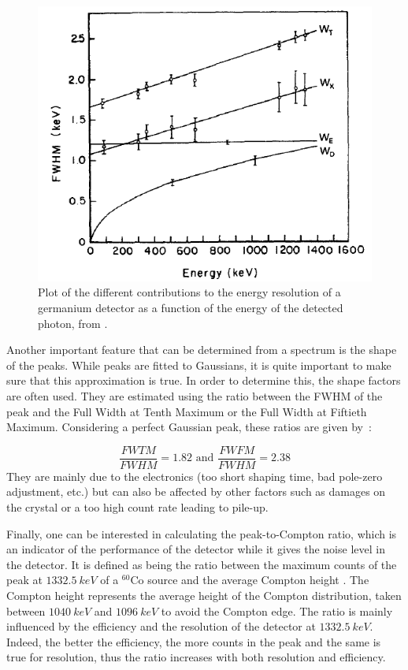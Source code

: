 \documentclass[11pt,a4paper]{article}
\begin{document}
\begin{figure}
\centering
\includegraphics[scale=0.9]{resolution.png}
\caption{Plot of the different contributions to the energy resolution of a germanium detector as a function of the energy of the detected photon, from \cite{Knoll}.}
\label{resolution}
\end{figure}

Another important feature that can be determined from a spectrum is the shape of the peaks. While peaks are fitted to Gaussians, it is quite important to make sure that this approximation is true. In order to determine this, the shape factors are often used. They are estimated using the ratio between the FWHM of the peak and the Full Width at Tenth Maximum or the Full Width at Fiftieth Maximum. Considering a perfect Gaussian peak, these ratios are given by~:

\begin{equation}
\dfrac{FWTM}{FWHM} = 1.82 \text{  and  } \dfrac{FWFM}{FWHM} = 2.38
\end{equation}
They are mainly due to the electronics (too short shaping time, bad pole-zero adjustment, etc.) but can also be affected by other factors such as damages on the crystal or a too high count rate leading to pile-up.

Finally, one can be interested in calculating the peak-to-Compton ratio, which is an indicator of the performance of the detector while it gives the noise level in the detector. It is defined as being the ratio between the maximum counts of the peak at $1332.5~keV$ of a $^{60}$Co source and the average Compton height \cite{Yii}. The Compton height represents the average height of the Compton distribution, taken between $1040~keV$ and $1096~keV$ to avoid the Compton edge. The ratio is mainly influenced by the efficiency and the resolution of the detector at $1332.5~keV$. Indeed, the better the efficiency, the more counts in the peak and the same is true for resolution, thus the ratio increases with both resolution and efficiency.
\end{document}

